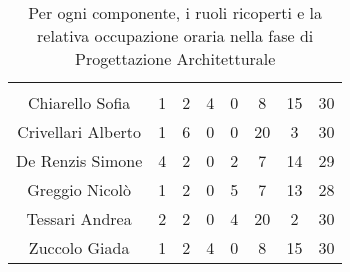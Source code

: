 \begin{table}[H]
	\begin{center}
		\begin{tabular}{c
				!{\color[HTML]{9b240a}\vrule width 1pt}
				cccccc
				!{\color[HTML]{9b240a}\vrule width 1pt}	
				c}
			\rowcolorhead
			 &  &  &  &  &  &  &  \\
			
			Chiarello Sofia & 1 & 2 & 4 & 0 & 8 & 15 & 30\\
			Crivellari Alberto & 1 & 6 & 0 & 0 & 20 & 3 & 30\\
			De Renzis Simone & 4 & 2 & 0 & 2 & 7 & 14 & 29\\
			Greggio Nicolò & 1 & 2 & 0 & 5 & 7 & 13 & 28\\
			Tessari Andrea & 2 & 2 & 0 & 4 & 20 & 2 & 30\\
			Zuccolo Giada & 1 & 2 & 4 & 0 & 8 & 15 & 30\\
		\end{tabular}
		\caption[Occupazione oraria Progettazione Architetturale]{Per ogni componente, i ruoli ricoperti e la relativa occupazione oraria nella fase di Progettazione Architetturale}
	\end{center}
\end{table}


